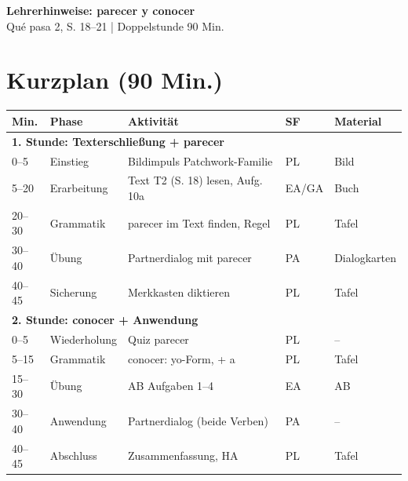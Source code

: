 \documentclass[11pt,a4paper]{article}
\begin{document}
\begin{center}
{\Large\textcolor{fach}{\textbf{Lehrerhinweise: parecer y conocer}}}\\[0.3cm]
{\small Qué pasa 2, S. 18--21 | Doppelstunde 90 Min.}
\end{center}

\vspace{0.5cm}

\section*{Kurzplan (90 Min.)}

\begin{longtable}{|p{1cm}|p{2cm}|p{6cm}|p{2cm}|p{2cm}|}
\hline
\textbf{Min.} & \textbf{Phase} & \textbf{Aktivität} & \textbf{SF} & \textbf{Material} \\
\hline
\endhead

\multicolumn{5}{|l|}{\textbf{1. Stunde: Texterschließung + parecer}} \\
\hline
0--5 & Einstieg & Bildimpuls Patchwork-Familie & PL & Bild \\
\hline
5--20 & Erarbeitung & Text T2 (S. 18) lesen, Aufg. 10a & EA/GA & Buch \\
\hline
20--30 & Grammatik & parecer im Text finden, Regel & PL & Tafel \\
\hline
30--40 & Übung & Partnerdialog mit parecer & PA & Dialogkarten \\
\hline
40--45 & Sicherung & Merkkasten diktieren & PL & Tafel \\
\hline

\multicolumn{5}{|l|}{\textbf{2. Stunde: conocer + Anwendung}} \\
\hline
0--5 & Wiederholung & Quiz parecer & PL & -- \\
\hline
5--15 & Grammatik & conocer: yo-Form, + a & PL & Tafel \\
\hline
15--30 & Übung & AB Aufgaben 1--4 & EA & AB \\
\hline
30--40 & Anwendung & Partnerdialog (beide Verben) & PA & -- \\
\hline
40--45 & Abschluss & Zusammenfassung, HA & PL & Tafel \\
\hline
\end{longtable}
\end{document}
